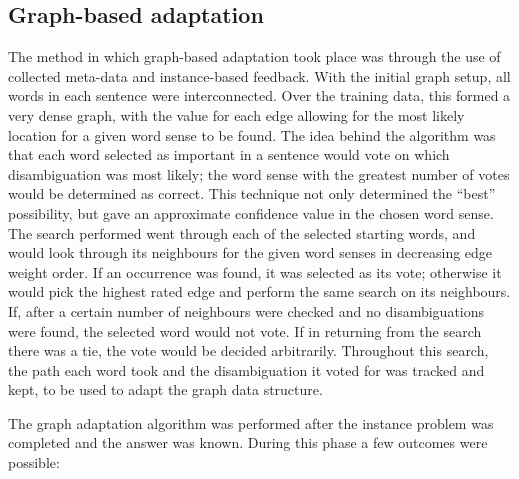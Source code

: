 \subsection{Graph-based adaptation}

The method in which graph-based adaptation took place was through the use of
collected meta-data and instance-based feedback.  With the initial graph
setup, all words in each sentence were interconnected. Over the training data,
this formed a very dense graph, with the value for each edge allowing for the
most likely location for a given word sense to be found.  The idea behind the
algorithm was that each word selected as important in a sentence would vote on which
disambiguation was most likely; the word sense with the greatest number of votes
would be determined as correct.  This technique not only determined the ``best''
possibility, but gave an approximate confidence value in the chosen word sense. The
search performed went through each of the selected starting words, and would
look through its neighbours for the given word senses in decreasing edge weight
order. If an occurrence was found, it was selected as its vote; otherwise it
would pick the highest rated edge and perform the same search on its neighbours.
If, after a certain number of neighbours were checked and no
disambiguations were found, the selected word would not vote.  If in returning
from the search there was a tie, the vote would be decided arbitrarily.
Throughout this search, the path each word took and the disambiguation it voted
for was tracked and kept, to be used to adapt the graph data structure.

The graph adaptation algorithm was performed after the instance problem was
completed and the answer was known.  During this phase a few outcomes were
possible: 

